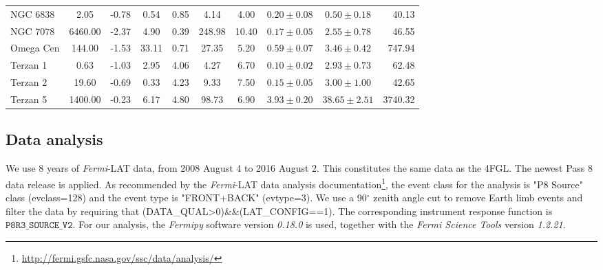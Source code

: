 \documentclass[doublespace,nopageskip]{VTthesis}
\begin{document}
\begin{table}
{\begin{tabular}{lccccccccr}
NGC 6838 & 2.05 & -0.78 & 0.54 & 0.85 & 4.14 & 4.00 & $0.20 \pm 0.08$ & $0.50 \pm 0.18$ & 40.13\\
NGC 7078 & 6460.00 & -2.37 & 4.90 & 0.39 & 248.98 & 10.40 & $0.17 \pm 0.05$ & $2.55 \pm 0.78$ & 46.55\\
Omega Cen & 144.00 & -1.53 & 33.11 & 0.71 & 27.35 & 5.20 & $0.59 \pm 0.07$ & $3.46 \pm 0.42$ & 747.94\\
Terzan 1 & 0.63 & -1.03 & 2.95 & 4.06 & 4.27 & 6.70 & $0.10 \pm 0.02$ & $2.93 \pm 0.73$ & 62.48\\
Terzan 2 & 19.60 & -0.69 & 0.33 & 4.23 & 9.33 & 7.50 & $0.15 \pm 0.05$ & $3.00 \pm 1.00$ & 42.65\\
Terzan 5 & 1400.00 & -0.23 & 6.17 & 4.80 & 98.73 & 6.90 & $3.93 \pm 0.20$ & $38.65 \pm 2.51$ & 3740.32\\
\bottomrule
\end{tabular}
}
\end{table}

\subsection{Data analysis}\label{sec:data}

We use 8 years of \textit{Fermi}-LAT data, from 2008 August 4 to 2016 August 2. This constitutes the same data as the 4FGL. The newest Pass 8 data release is applied. As recommended by the \textit{Fermi}-LAT data analysis documentation\footnote{\url{http://fermi.gsfc.nasa.gov/ssc/data/analysis/}}, the event class for the analysis is "P8 Source" class (evclass=128) and the event type is "FRONT+BACK" (evtype=3). We use a 90$^{\circ}$ zenith angle cut to remove Earth limb events and filter the data by requiring that (DATA\_QUAL>0)\&\&(LAT\_CONFIG==1). The corresponding instrument response function is $\texttt{P8R3\_SOURCE\_V2}$. For our analysis, the \textit{Fermipy} software version \textit{0.18.0} is used, together with the \textit{Fermi Science Tools} version \textit{1.2.21}.
\end{document}
